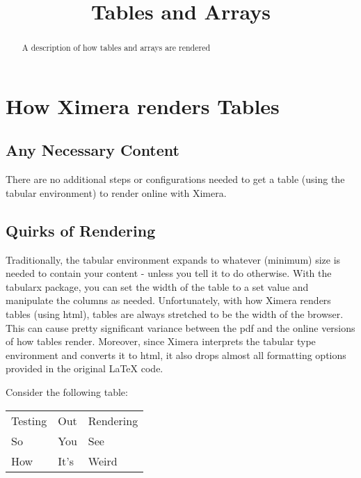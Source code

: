 \documentclass{ximera}
\title{Tables and Arrays}
\begin{document}
\begin{abstract}
    A description of how tables and arrays are rendered
\end{abstract}
\maketitle


\section*{How Ximera renders Tables}
    \subsection*{Any Necessary Content}
        There are no additional steps or configurations needed to get a table (using the tabular environment) to render online with Ximera.
        
        
    \subsection*{Quirks of Rendering}
        Traditionally, the tabular environment expands to whatever (minimum) size is needed to contain your content - unless you tell it to do otherwise. With the tabularx package, you can set the width of the table to a set value and manipulate the columns as needed. Unfortunately, with how Ximera renders tables (using html), tables are always stretched to be the width of the browser. This can cause pretty significant variance between the pdf and the online versions of how tables render. Moreover, since Ximera interprets the tabular type environment and converts it to html, it also drops almost all formatting options provided in the original LaTeX code.
        
        Consider the following table:
        
        \begin{tabular}{lll}
            Testing & Out & Rendering\\
            So      & You & See\\
            How     & It's& Weird\\
        \end{tabular}
        
\end{document}
